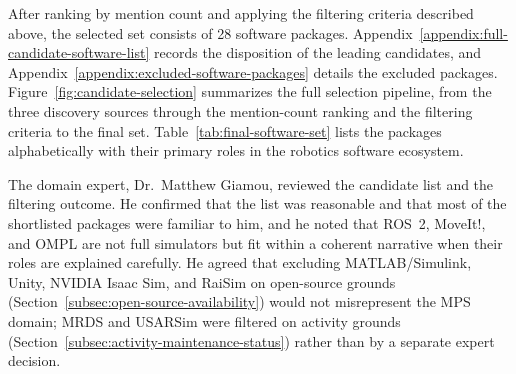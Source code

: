 After ranking by mention count and applying the filtering criteria described above, the selected set consists of 28 software packages. Appendix~\ref{appendix:full-candidate-software-list} records the disposition of the leading candidates, and Appendix~\ref{appendix:excluded-software-packages} details the excluded packages. Figure~\ref{fig:candidate-selection} summarizes the full selection pipeline, from the three discovery sources through the mention-count ranking and the filtering criteria to the final set. Table~\ref{tab:final-software-set} lists the packages alphabetically with their primary roles in the robotics software ecosystem.

The domain expert, Dr.~Matthew Giamou, reviewed the candidate list and the filtering outcome. He confirmed that the list was reasonable and that most of the shortlisted packages were familiar to him, and he noted that ROS~2, MoveIt!, and OMPL are not full simulators but fit within a coherent narrative when their roles are explained carefully. He agreed that excluding MATLAB/Simulink, Unity, NVIDIA Isaac Sim, and RaiSim on open-source grounds (Section~\ref{subsec:open-source-availability}) would not misrepresent the MPS domain; MRDS and USARSim were filtered on activity grounds (Section~\ref{subsec:activity-maintenance-status}) rather than by a separate expert decision.

